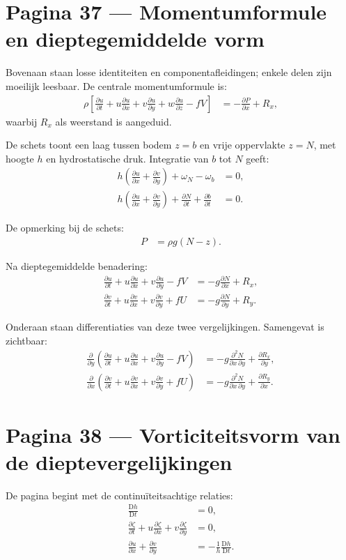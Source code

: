 \documentclass[11pt]{article}
\newcommand{\D}{\mathrm{D}}
\newcommand{\pd}[2]{\frac{\partial #1}{\partial #2}}
\begin{document}
\newpage

\section*{Pagina 37 --- Momentumformule en dieptegemiddelde vorm}

Bovenaan staan losse identiteiten en componentafleidingen; enkele delen zijn moeilijk leesbaar. De centrale momentumformule is:
\begin{align*}
\rho
\left[
\pd{u}{t}
+u\pd{u}{x}
+v\pd{u}{y}
+w\pd{u}{z}
-fV
\right]
&=
-\pd{P}{x}
+R_x,
\end{align*}
waarbij $R_x$ als weerstand is aangeduid.

De schets toont een laag tussen bodem $z=b$ en vrije oppervlakte $z=N$, met hoogte $h$ en hydrostatische druk. Integratie van $b$ tot $N$ geeft:
\begin{align*}
h\left(
\pd{u}{x}
+\pd{v}{y}
\right)
+\omega_N-\omega_b
&=
0,
\\
h\left(
\pd{u}{x}
+\pd{v}{y}
\right)
+\pd{N}{t}
+\pd{b}{t}
&=
0.
\end{align*}

De opmerking bij de schets:
\begin{align*}
P
  &=
  \rho g\left(N-z\right).
\end{align*}

Na dieptegemiddelde benadering:
\begin{align*}
\pd{u}{t}
+u\pd{u}{x}
+v\pd{u}{y}
-fV
&=
-g\pd{N}{x}
+R_x,
\\
\pd{v}{t}
+u\pd{v}{x}
+v\pd{v}{y}
+fU
&=
-g\pd{N}{y}
+R_y.
\end{align*}

Onderaan staan differentiaties van deze twee vergelijkingen. Samengevat is zichtbaar:
\begin{align*}
\pd{}{y}
\left(
\pd{u}{t}
+u\pd{u}{x}
+v\pd{u}{y}
-fV
\right)
&=
-g\frac{\partial^2 N}{\partial x\,\partial y}
+\pd{R_x}{y},
\\
\pd{}{x}
\left(
\pd{v}{t}
+u\pd{v}{x}
+v\pd{v}{y}
+fU
\right)
&=
-g\frac{\partial^2 N}{\partial x\,\partial y}
+\pd{R_y}{x}.
\end{align*}

\newpage

\section*{Pagina 38 --- Vorticiteitsvorm van de dieptevergelijkingen}

De pagina begint met de continuïteitsachtige relaties:
\begin{align*}
\frac{\D h}{\D t}
&=
0,
\\
\pd{\zeta}{t}
+u\pd{\zeta}{x}
+v\pd{\zeta}{y}
&=
0,
\\
\pd{u}{x}
+\pd{v}{y}
&=
-\frac{1}{h}\frac{\D h}{\D t}.
\end{align*}
\end{document}
